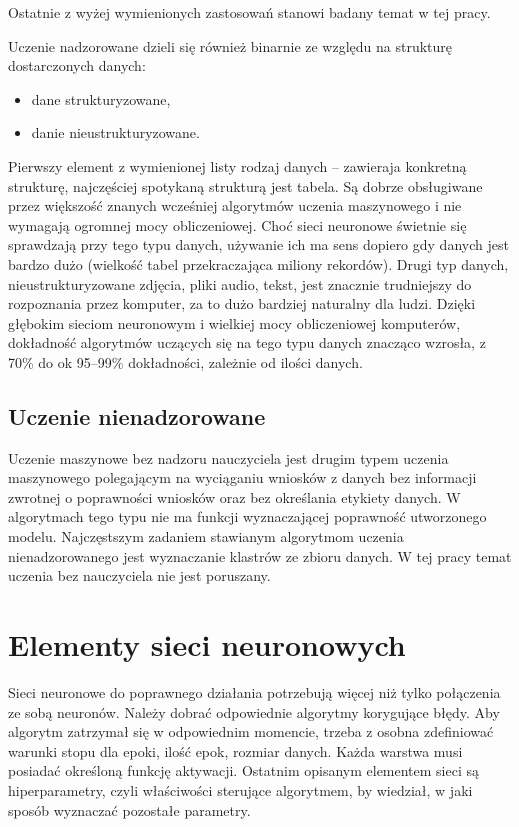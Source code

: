 \documentclass[12pt,a4paper,twoside,titlepage,openright]{book}
\begin{document}
Ostatnie z wyżej wymienionych zastosowań stanowi badany temat w tej pracy.

Uczenie nadzorowane dzieli się również binarnie ze względu na strukturę dostarczonych danych:
\begin{itemize}
\item dane strukturyzowane,
\item danie nieustrukturyzowane.
\end{itemize}

Pierwszy element z wymienionej listy rodzaj danych -- zawieraja konkretną strukturę, najczęściej spotykaną strukturą jest tabela. Są dobrze obsługiwane przez większość znanych wcześniej algorytmów uczenia maszynowego i nie wymagają ogromnej mocy obliczeniowej. Choć sieci neuronowe świetnie się sprawdzają przy tego typu danych, używanie ich ma sens dopiero gdy danych jest bardzo dużo (wielkość tabel przekraczająca miliony rekordów). Drugi typ danych, nieustrukturyzowane zdjęcia, pliki audio, tekst, jest znacznie trudniejszy do rozpoznania przez komputer, za to dużo bardziej naturalny dla ludzi. Dzięki głębokim sieciom neuronowym i wielkiej mocy obliczeniowej komputerów, dokładność algorytmów uczących się na tego typu danych znacząco wzrosła, z 70\% do ok 95--99\% dokładności, zależnie od ilości danych.

\subsection*{Uczenie nienadzorowane}
Uczenie maszynowe bez nadzoru nauczyciela jest drugim typem uczenia maszynowego polegającym na wyciąganiu wniosków z danych bez informacji zwrotnej o poprawności wniosków oraz bez określania etykiety danych. W algorytmach tego typu nie ma funkcji wyznaczającej poprawność utworzonego modelu. Najczęstszym zadaniem stawianym algorytmom uczenia nienadzorowanego jest wyznaczanie klastrów ze zbioru danych. W tej pracy temat uczenia bez nauczyciela nie jest poruszany.

\section{Elementy sieci neuronowych} 
Sieci neuronowe do poprawnego działania potrzebują więcej niż tylko połączenia ze sobą neuronów. Należy dobrać odpowiednie algorytmy korygujące błędy. Aby algorytm zatrzymał się w odpowiednim momencie, trzeba z osobna zdefiniować warunki stopu dla epoki, ilość epok, rozmiar danych. Każda warstwa musi posiadać określoną funkcję aktywacji. Ostatnim opisanym elementem sieci są hiperparametry, czyli właściwości sterujące algorytmem, by wiedział, w jaki sposób wyznaczać pozostałe parametry.
\end{document}

